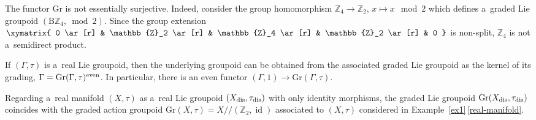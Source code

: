 \documentclass[pdftex]{sigma}
\numberwithin{equation}{section}
\def\Z {\mathbb{Z}}
\def\act#1#2{#1/\!\!/#2}
\newcommand{\id}{\operatorname{id}}
\def\Gr{\mathrm{Gr}}
\begin{document}
\begin{Remark}
 The functor $\Gr$ is not essentially surjective. Indeed, consider the group homomorphism $\Z_4 \to \Z_2$, $x \mapsto x \mod 2$ which defines a~graded Lie groupoid
 $(\mathrm{B}\Z_4,\bmod 2)$. Since the group extension
$
 \xymatrix{
 0 \ar[r] & \Z_2 \ar[r] & \Z_4 \ar[r] & \Z_2 \ar[r] & 0
 }
$
 is non-split, $\Z_4$ is not a~semidirect product.
\end{Remark}

\begin{Remark}
\label{graded-groupoid-functor-inclusion}
If $(\Gamma,\tau)$ is a~real Lie groupoid, then the underlying groupoid can be obtained from the associated graded Lie groupoid as the kernel of its grading,
$
\Gamma = \Gr(\Gamma,\tau)^{\rm even}$.
In particular, there is an even functor $(\Gamma,1) \to \Gr(\Gamma,\tau)$.
\end{Remark}

\begin{Remark}
 Regarding a~real manifold $(X,\tau)$ as a~real Lie groupoid $(X_{\rm dis},\tau_{\rm dis})$ with only identity morphisms, the graded Lie groupoid $\Gr(X_{\rm dis},\tau_{\rm dis})$ coincides with the graded action groupoid $\mathrm{Gr}(X,\tau) =\act X{(\Z_2,\id)}$ associated to $(X,\tau)$ considered in Example~\ref{ex1}\,\ref{real-manifold}.
\end{Remark}
\end{document}
